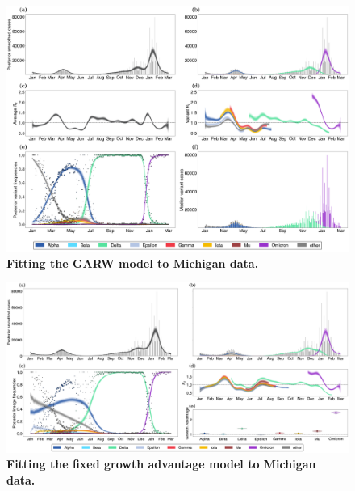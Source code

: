 \documentclass[11pt,oneside,letterpaper]{article}
\begin{document}
\begin{figure}
  \centering
  \includegraphics[width=\linewidth]{figs/GARW_rt_Michigan.png}
  \caption{\textbf{Fitting the GARW model to Michigan data.}}%
  \label{fig:GARW_rt_Michigan}
\end{figure}

\begin{figure}
  \centering
  \includegraphics[width=\linewidth]{figs/fixed_growth_Michigan.png}
  \caption{\textbf{Fitting the fixed growth advantage model to Michigan data.}}%
  \label{fig:fixed_growth_Michigan}
\end{figure}
\end{document}

